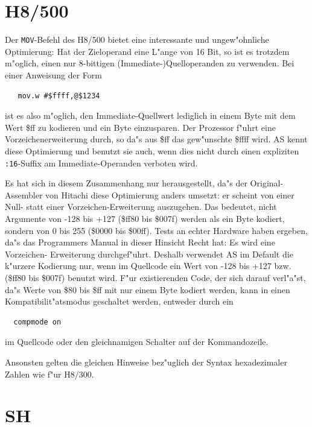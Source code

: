 \documentclass[12pt,a4paper,twoside]{report}
\newcommand{\tty}[1]{{\tt #1}}
\newcommand{\asname}{AS}
\begin{document}

\section{H8/500}

Der {\tt MOV}-Befehl des H8/500 bietet eine interessante und ungew"ohnliche
Optimierung: Hat der Zieloperand eine L"ange von 16 Bit, so ist es trotzdem
m"oglich, einen nur 8-bittigen (Immediate-)Quelloperanden zu verwenden.  Bei
einer Anweisung der Form
\begin{verbatim}
   mov.w #$ffff,@$1234
\end{verbatim}
ist es also m"oglich, den Immediate-Quellwert lediglich in einem Byte mit
dem Wert \$ff zu kodieren und ein Byte einzusparen.  Der Prozessor f"uhrt
eine Vorzeichenerweiterung durch, so da"s aus \$ff das gew"unschte \$ffff
wird.  \asname{} kennt diese Optimierung und benutzt sie auch, wenn dies nicht
durch einen expliziten \tty{:16}-Suffix am Immediate-Operanden verboten
wird.

Es hat sich in diesem Zusammenhang nur herausgestellt, da"s der Original-Assembler
von Hitachi diese Optimierung anders umsetzt: er scheint von einer Null- statt
einer Vorzeichen-Erweiterung auszugehen.  Das bedeutet, nicht Argumente von
-128 bis +127 (\$ff80 bis \$007f) werden als ein Byte kodiert, sondern von 0 bis
255 (\$0000 bis \$00ff).  Tests an echter Hardware haben ergeben, da"s
das Programmers Manual in dieser Hinsicht Recht hat: Es wird eine Vorzeichen-
Erweiterung durchgef"uhrt.  Deshalb verwendet \asname{} im Default die k"urzere
Kodierung nur, wenn im Quellcode ein Wert von -128 bis +127 bzw. (\$ff80 bis
\$007f) benutzt wird.  F"ur existierenden Code, der sich darauf verl"a"st,
da"s Werte von \$80 bis \$ff mit nur einem Byte kodiert werden, kann in einen
Kompatibilit"atsmodus geschaltet werden, entweder durch ein
\begin{verbatim}
  compmode on
\end{verbatim}
im Quellcode oder den gleichnamigen Schalter auf der Kommandozeile.

Ansonsten gelten die gleichen Hinweise bez"uglich der Syntax hexadezimaler
Zahlen wie f"ur H8/300.


\section{SH}
\end{document}
